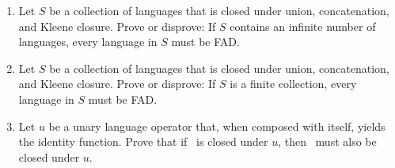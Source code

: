 \begin{enumerate}[{5.}1. ]
\item Let $S$ be a collection of languages that is closed under union,
concatenation, and Kleene closure. Prove or disprove: If $S$ contains an
infinite number of languages, every language in $S$ must be FAD.

\item Let $S$ be a collection of languages that is closed under union,
concatenation, and Kleene closure. Prove or disprove: If $S$ is a finite
collection, every language in $S$ must be FAD.

\item Let $u$ be a unary language operator that, when composed with itself,
yields the identity function. Prove that if \DSIG\ is closed under $u$,
then \NSIG\ must also be closed under $u$.
\end{enumerate}
